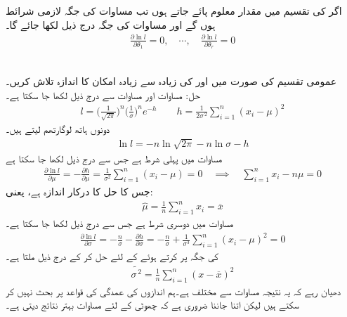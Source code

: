 اگر  کی تقسیم میں  مقدار معلوم  پائے جاتے ہوں تب مساوات  کی جگہ  لازمی شرائط  ہوں  گے اور مساوات  کی جگہ درج ذیل لکھا جائے گا۔ 
\begin{align}\label{مساوات_شماریات_زیادہ_سے_زیادہ_پ}
\frac{\partial \ln l}{\partial \theta_1}=0,\quad \cdots,\quad \frac{\partial \ln l}{\partial \theta_r}=0
\end{align}

\quad {}\\
عمومی تقسیم کی صورت میں  اور  کی زیادہ سے زیادہ امکان کا اندازہ تلاش کریں۔\\
حل:\quad
مساوات  اور  مساوات  سے درج ذیل لکھا جا سکتا ہے۔
\begin{align*}
l=\big(\frac{1}{\sqrt{2\pi}}\big)^n \big(\frac{1}{\sigma}\big)^n e^{-h}\quad \quad h=\frac{1}{2\sigma^{\,2}}\sum_{i=1}^{n}(x_i-\mu)^2
\end{align*}
دونوں ہاتھ لوگارتھم لیتے ہیں۔
\begin{align*}
\ln l=-n\ln \sqrt{2\pi}-n\ln \sigma-h
\end{align*} 
مساوات  میں پہلی شرط  ہے جس سے  درج ذیل لکھا جا سکتا ہے
\begin{align*}
\frac{\partial \ln l}{\partial \mu}=-\frac{\partial h}{\partial \mu}=\frac{1}{\sigma^2}\sum_{i=1}^{n}(x_i-\mu)=0\quad \implies \quad \sum_{i=1}^{n} x_i-n\mu=0
\end{align*}
جس کا حل  کا درکار اندازہ  ہے، یعنی:
\begin{align*}
\widehat{\mu}=\frac{1}{n}\sum_{i=1}^{n} x_i=\overline{x}
\end{align*} 
مساوات  میں دوسری شرط  ہے  جس سے  درج ذیل لکھا جا سکتا ہے۔
\begin{align*}
\frac{\partial \ln l}{\partial \sigma}=-\frac{n}{\sigma}-\frac{\partial h}{\partial \sigma}=-\frac{n}{\sigma}+\frac{1}{\sigma^3}\sum_{i=1}^{n} (x_i-\mu)^2=0
\end{align*}
 کی جگہ  پر کرتے ہوئے  کے لئے حل کر کے درج ذیل ملتا ہے۔
\begin{align*}
\widetilde{\sigma^{\,2}}=\frac{1}{n}\sum_{i=1}^{n} (x-\overline{x})^2
\end{align*}
دھیان رہے کہ یہ نتیجہ مساوات  سے مختلف ہے۔ہم اندازوں کی عمدگی کی قواعد پر بحث نہیں کر سکتے ہیں لیکن اتنا جاننا ضروری ہے کہ چھوٹی  کے لئے  مساوات  بہتر نتائج دیتی ہے۔

